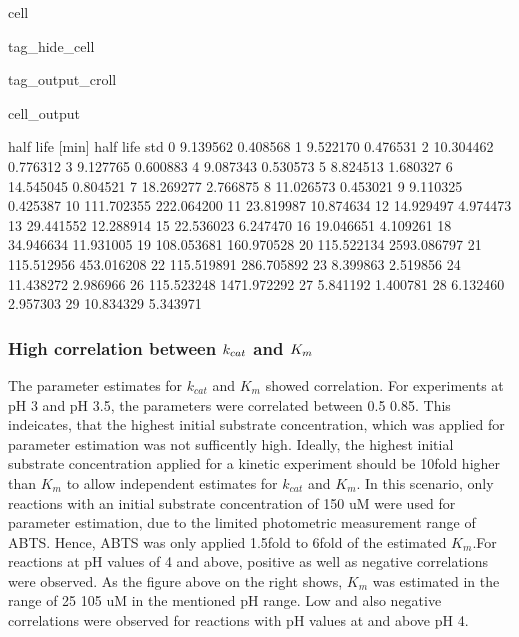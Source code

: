 \documentclass[letterpaper,10pt,english]{jupyterBook}
\begin{document}
\begin{sphinxuseclass}{cell}
\begin{sphinxuseclass}{tag_hide_cell}
\begin{sphinxuseclass}{tag_output_croll}
\begin{sphinxVerbatimOutput}
\begin{sphinxuseclass}{cell_output}
\begin{sphinxVerbatim}[commandchars=\\\{\}]
    half life [min]  half life std  
0          9.139562       0.408568  
1          9.522170       0.476531  
2         10.304462       0.776312  
3          9.127765       0.600883  
4          9.087343       0.530573  
5          8.824513       1.680327  
6         14.545045       0.804521  
7         18.269277       2.766875  
8         11.026573       0.453021  
9          9.110325       0.425387  
10       111.702355     222.064200  
11        23.819987      10.874634  
12        14.929497       4.974473  
13        29.441552      12.288914  
15        22.536023       6.247470  
16        19.046651       4.109261  
18        34.946634      11.931005  
19       108.053681     160.970528  
20       115.522134    2593.086797  
21       115.512956     453.016208  
22       115.519891     286.705892  
23         8.399863       2.519856  
24        11.438272       2.986966  
26       115.523248    1471.972292  
27         5.841192       1.400781  
28         6.132460       2.957303  
29        10.834329       5.343971  
\end{sphinxVerbatim}

\end{sphinxuseclass}\end{sphinxVerbatimOutput}

\end{sphinxuseclass}
\end{sphinxuseclass}
\end{sphinxuseclass}

\subsubsection{High correlation between \protect\(k_{cat}\protect\) and \protect\(K_{m}\protect\)}
\label{\detokenize{scenarios/SLAC_kinetic_characterization:high-correlation-between-k-cat-and-k-m}}
\sphinxAtStartPar
The parameter estimates for \(k_{cat}\) and \(K_{m}\) showed correlation. For experiments at pH 3 and pH 3.5, the parameters were correlated between 0.5 \sphinxhyphen{} 0.85. This indeicates, that the highest initial substrate concentration, which was applied for parameter estimation was not sufficently high. Ideally, the highest initial substrate concentration applied for a kinetic experiment should be 10\sphinxhyphen{}fold higher than \(K_{m}\) to allow independent estimates for \(k_{cat}\) and \(K_{m}\). In this scenario, only reactions with an initial substrate concentration of 150 uM were used for parameter estimation, due to the limited photometric measurement range of ABTS. Hence, ABTS was only applied 1.5\sphinxhyphen{}fold to 6\sphinxhyphen{}fold of the estimated \(K_{m}\).For reactions at pH values of 4 and above, positive as well as negative correlations were observed.
As the figure above on the right shows, \(K_{m}\) was estimated in the range of 25 \sphinxhyphen{} 105 uM in the mentioned pH range.
Low and also negative correlations were observed for reactions with pH values at and above pH 4.
\end{document}
